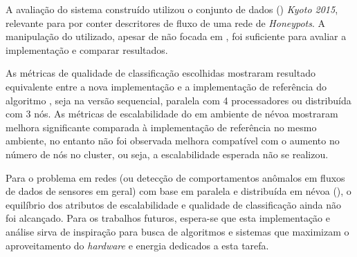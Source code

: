 A avaliação do sistema construído utilizou o conjunto de dados (\dataset)
\emph{Kyoto 2015}, relevante para \nids por conter descritores de fluxo de uma
rede de \emph{Honeypots}.
A manipulação do \dataset utilizado, apesar de não focada em \nids, foi
suficiente para avaliar a implementação e comparar resultados.


As métricas de qualidade de classificação escolhidas mostraram resultado
equivalente entre a nova implementação e a implementação de referência do
algoritmo \minas, seja na versão sequencial, paralela com 4 processadores ou
distribuída com 3 nós.
As métricas de escalabilidade do \mfog em ambiente de névoa \iot mostraram
melhora significante comparada à implementação de referência no mesmo ambiente,
no entanto não foi observada melhora compatível com o aumento no número de nós
no cluster, ou seja, a escalabilidade esperada não se realizou.






Para o problema \nids em redes \iot (ou detecção de comportamentos anômalos em
fluxos de dados de sensores \iot em geral) com base em \nd paralela e
distribuída em névoa (\fog), o equilíbrio dos atributos de escalabilidade e
qualidade de classificação ainda não foi alcançado.
Para os trabalhos futuros, espera-se que esta implementação e análise sirva de
inspiração para busca de algoritmos e sistemas que maximizam o aproveitamento do
\emph{hardware} e energia dedicados a esta tarefa.

